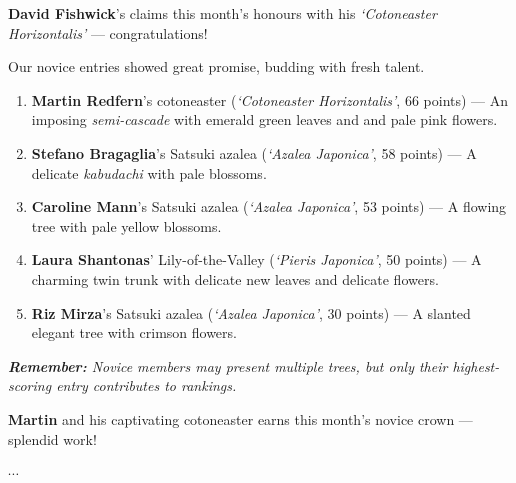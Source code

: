 \noindent 
\textbf{David Fishwick}'s claims this month's honours with his \textit{`Cotoneaster Horizontalis'} --- congratulations!

\noindent
Our novice entries showed great promise, budding with fresh talent.

\begin{enumerate}
    \item \textbf{Martin Redfern}'s cotoneaster (\textit{`Cotoneaster Horizontalis'}, 66 points) --- An imposing \textit{semi\--cascade} with emerald green leaves and and pale pink flowers.
    
    \item \textbf{Stefano Bragaglia}'s Satsuki azalea (\textit{`Azalea Japonica'}, 58 points) --- A delicate \textit{kabudachi} with pale blossoms.

    \item \textbf{Caroline Mann}'s Satsuki azalea (\textit{`Azalea Japonica'}, 53 points) --- A flowing tree with pale yellow blossoms.
    
    \item \textbf{Laura Shantonas}' Lily\--of\--the\--Valley (\textit{`Pieris Japonica'}, 50 points) --- A charming twin trunk with delicate new leaves and delicate flowers.

    \item \textbf{Riz Mirza}'s Satsuki azalea (\textit{`Azalea Japonica'}, 30 points) --- A slanted elegant tree with crimson flowers.    
\end{enumerate}

\textit{\textbf{Remember:} Novice members may present multiple trees, but only their highest\--scoring entry contributes to rankings.}
\medskip 

\noindent
\textbf{Martin} and his captivating cotoneaster earns this month's novice crown --- splendid work!

\vspace{-0.25em}
\begin{center}
    $\cdots$
\end{center}
\vspace{-0.25em}

% 

